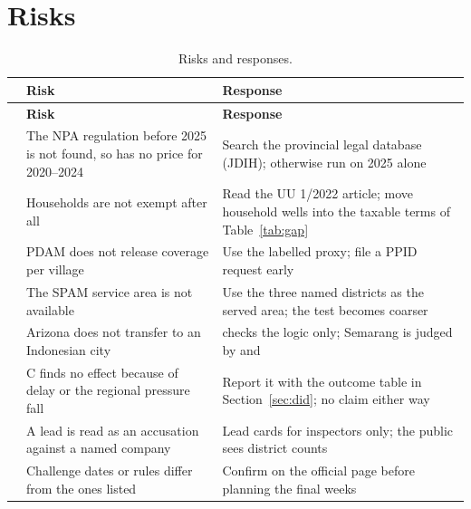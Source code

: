 \section{Risks}\label{sec:risks}

{\small
\begin{xltabular}{\linewidth}{@{}L{8mm}L{50mm}Y@{}}
\caption{Risks and responses.}\label{tab:risks}\\*
\toprule
 & \textbf{Risk} & \textbf{Response}\\*
\midrule
\endfirsthead
\toprule
 & \textbf{Risk} & \textbf{Response}\\*
\midrule
\endhead
{} & The NPA regulation before 2025 is not found, so  has no price for 2020--2024 & Search the provincial legal database (JDIH); otherwise run  on 2025 alone\\
 & Households are not exempt after all & Read the UU 1/2022 article; move household wells into the taxable terms of Table~\ref{tab:gap}\\
 & PDAM does not release coverage per village & Use the labelled proxy; file a PPID request early\\
 & The SPAM service area is not available & Use the three named districts as the served area; the test becomes coarser\\
 & Arizona does not transfer to an Indonesian city &  checks the logic only; Semarang is judged by  and \\
 & C finds no effect because of delay or the regional pressure fall & Report it with the outcome table in Section~\ref{sec:did}; no claim either way\\
 & A lead is read as an accusation against a named company & Lead cards for inspectors only; the public sees district counts\\
 & Challenge dates or rules differ from the ones listed & Confirm on the official page before planning the final weeks\\
\bottomrule
\end{xltabular}}
